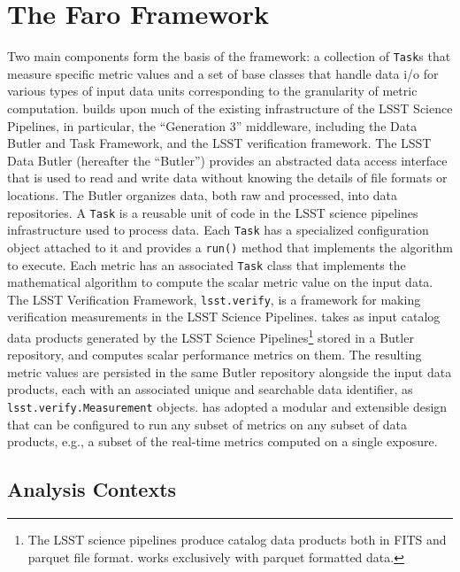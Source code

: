 \section{The Faro Framework} \label{sec:faro}

Two main components form the basis of the \faro framework: a collection of \texttt{Task}s that measure specific metric values and a set of base classes that handle data i/o for various types of input data units corresponding to the granularity of metric computation.
\faro builds upon much of the existing infrastructure of the LSST Science Pipelines, in particular, the ``Generation 3'' middleware, including the Data Butler and Task Framework\cite{SPIE-12189-40}, and the LSST verification framework\cite{DMTN-098, SQR-019}.
The LSST Data Butler (hereafter the ``Butler'') provides an abstracted data access interface that is used to read and write data without knowing the details of file formats or locations.
The Butler organizes data, both raw and processed, into data repositories.
A \texttt{Task} is a reusable unit of code in the LSST science pipelines infrastructure used to process data.
Each \texttt{Task} has a specialized configuration object attached to it and provides a \texttt{run()} method that implements the algorithm to execute. 
Each \faro metric has an associated \texttt{Task} class that implements the mathematical algorithm to compute the scalar metric value on the input data.
The LSST Verification Framework, \texttt{lsst.verify}, is a framework for making verification measurements in the LSST Science Pipelines.
\faro takes as input catalog data products generated by the LSST Science Pipelines\footnote{The LSST science pipelines produce catalog data products both in FITS and parquet file format. 
\faro works exclusively with parquet formatted data.} stored in a Butler repository,
 and computes scalar performance metrics on them. 
The resulting metric values are persisted in the same Butler repository alongside the input data products, each with an associated unique and searchable data identifier,
as \texttt{lsst.verify.Measurement} objects.
\faro has adopted a modular and extensible design that can be configured to run any subset of metrics on any subset of data products, e.g., a subset of the real-time metrics computed on a single exposure.

\subsection{Analysis Contexts} \label{ssec:analysis_context}


